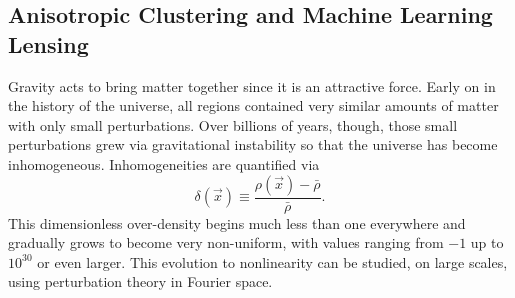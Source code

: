 \documentclass[12pt]{article}
\newcommand\be{\begin{equation}}
\def\ee{\end{equation}}
\begin{document}
\begin{small}

\subsection{Anisotropic Clustering and Machine Learning Lensing}

Gravity acts to bring matter together since it is an attractive force. Early on in the history of the universe, all regions contained very similar amounts of matter with only small perturbations. Over billions of years, though, those small perturbations grew via gravitational instability so that the universe has become inhomogeneous. Inhomogeneities are quantified via
\be
\delta(\vec x) \equiv \frac{\rho(\vec x) - \bar\rho}{\bar\rho}.\ee
This dimensionless over-density begins much less than one everywhere and gradually grows to become very non-uniform, with values ranging from $-1$ up to $10^{30}$ or even larger. This evolution to nonlinearity can be studied, on large scales, using perturbation theory in Fourier space.


\end{small}
\end{document}
